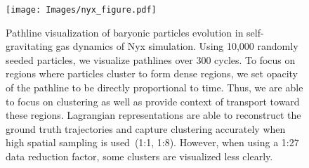 \begin{figure}[!t]
\centering
\texttt{[image: Images/nyx\_figure.pdf]}
\vspace{-5mm}
\caption{
Pathline visualization of baryonic particles evolution in self-gravitating gas dynamics of Nyx simulation. Using 10,000 randomly seeded particles, we visualize pathlines over 300 cycles. To focus on regions where particles cluster to form dense regions, we set opacity of the pathline to be directly proportional to time. Thus, we are able to focus on clustering as well as provide context of transport toward these regions. Lagrangian representations are able to reconstruct the ground truth trajectories and capture clustering accurately when high spatial sampling is used~(1:1, 1:8). However, when using a 1:27 data reduction factor, some clusters are visualized less clearly.} 
\vspace{-5mm}
\label{fig:nyx_figure}
\end{figure}
